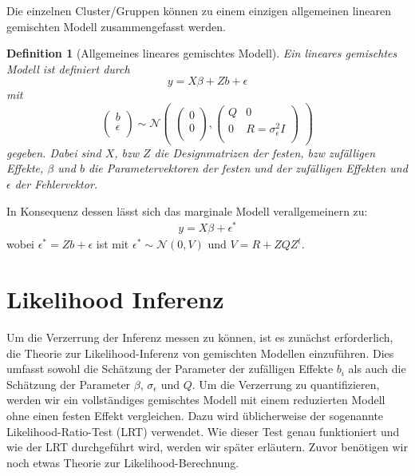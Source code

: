 \documentclass[%
thesis=student,%
coverpage=false,%
titlepage=false,%
headmarks=true, %
german,%
font=libertine, %
math=newpxtx, %
BCOR=5mm,%
coverBCOR=11mm%
]{tumbook}
\theoremstyle{break}
\newtheorem{definition}{Definition}[section]
\begin{document}
Die einzelnen Cluster/Gruppen können zu einem einzigen allgemeinen linearen gemischten Modell zusammengefasst werden.
\begin{definition}[Allgemeines lineares gemischtes Modell]
	Ein lineares gemischtes Modell ist definiert durch
	$$y = X\beta + Zb + \epsilon $$
	mit $$\begin{pmatrix}
		b \\
		\epsilon \\
	\end{pmatrix}
	\sim
	\mathcal{N}
	\begin{pmatrix}
		\begin{pmatrix}
			
			0 \\
			0 \\
		\end{pmatrix},
		\begin{pmatrix}
			Q & 0 \\
			0 & R = \sigma_\epsilon^2I \\
		\end{pmatrix}
	\end{pmatrix}$$
	gegeben. Dabei sind $X$, bzw $Z$ die Designmatrizen der festen, bzw zufälligen Effekte, $\beta$ und $b$ die Parametervektoren der festen und der zufälligen Effekten und $\epsilon$ der Fehlervektor.
\end{definition}\noindent
In Konsequenz dessen lässt sich das marginale Modell verallgemeinern zu: 
\begin{align}	
	y = X\beta + \epsilon^* \label{marginales Modell}
\end{align}
wobei $\epsilon^* = Zb + \epsilon$ ist mit $\epsilon^* \sim \mathcal{N}(0,V)$ und $V= R + ZQZ^t$.


\section{Likelihood Inferenz}
Um die Verzerrung der Inferenz messen zu können, ist es zunächst erforderlich, die Theorie zur Likelihood-Inferenz von gemischten Modellen einzuführen. Dies umfasst sowohl die Schätzung der Parameter der zufälligen Effekte $b_i$ als auch die Schätzung der Parameter $\beta$, $\sigma_\epsilon$ und $Q$. Um die Verzerrung zu quantifizieren, werden wir ein vollständiges gemischtes Modell mit einem reduzierten Modell ohne einen festen Effekt vergleichen. Dazu wird üblicherweise der sogenannte Likelihood-Ratio-Test (LRT) verwendet.
Wie dieser Test genau funktioniert und wie der LRT durchgeführt wird, werden wir später erläutern. Zuvor benötigen wir noch etwas Theorie zur Likelihood-Berechnung.
\end{document}
